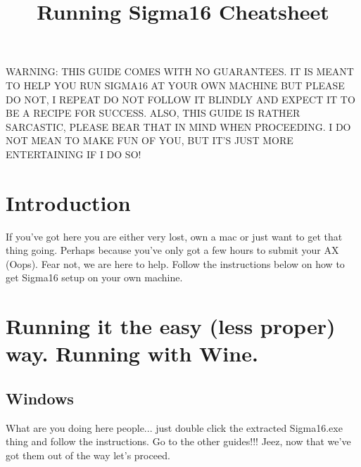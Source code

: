 \documentclass[11pt,a4paper]{article}
\title{Running Sigma16 Cheatsheet}
\begin{document}
\maketitle


WARNING: THIS GUIDE COMES WITH NO GUARANTEES. IT IS MEANT TO HELP YOU RUN SIGMA16 AT YOUR OWN MACHINE BUT PLEASE DO NOT, I REPEAT DO NOT FOLLOW IT BLINDLY AND EXPECT IT TO BE A RECIPE FOR SUCCESS. ALSO, THIS GUIDE IS RATHER SARCASTIC, PLEASE BEAR THAT IN MIND WHEN PROCEEDING. I DO NOT MEAN TO MAKE FUN OF YOU, BUT IT'S JUST MORE ENTERTAINING IF I DO SO!


\section{Introduction}

 If you've got here you are either very lost, own a mac or just want to get that thing going. Perhaps because you've only got a few hours to submit your AX (Oops). Fear not, we are here to help. Follow the instructions below on how to get Sigma16 setup on your own machine.

\section{Running it the easy (less proper) way. Running with Wine.}

\setcounter{subsection}{-1}
 \subsection{Windows}
   What are you doing here people... just double click the extracted Sigma16.exe thing and follow the instructions. Go to the other guides!!! Jeez, now that we've got them out of the way let's proceed.
\end{document}
